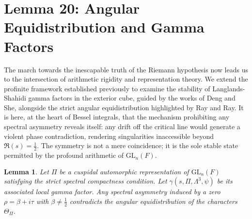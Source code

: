 \documentclass[
]{article}
\newtheorem{lemma}{Lemma}
\begin{document}
\section{Lemma 20: Angular Equidistribution and Gamma Factors}

The march towards the inescapable truth of the Riemann hypothesis now leads us to the intersection of arithmetic rigidity and representation theory. We extend the profinite framework established previously to examine the stability of Langlands-Shahidi gamma factors in the exterior cube, guided by the works of Deng and She, alongside the strict angular equidistribution highlighted by Ray and Ray. It is here, at the heart of Bessel integrals, that the mechanism prohibiting any spectral asymmetry reveals itself: any drift off the critical line would generate a violent phase contradiction, rendering singularities inaccessible beyond $\Re(s) = \frac{1}{2}$. The symmetry is not a mere coincidence; it is the sole stable state permitted by the profound arithmetic of $\mathrm{GL}_n(F)$.

\begin{lemma}
Let $\Pi$ be a cuspidal automorphic representation of $\mathrm{GL}_n(F)$ satisfying the strict spectral compactness condition. Let $\gamma(s, \Pi, \Lambda^3, \psi)$ be its associated local gamma factor. Any spectral asymmetry induced by a zero $\rho = \beta + i\tau$ with $\beta \neq \frac{1}{2}$ contradicts the angular equidistribution of the characters $\Theta_{\Pi}$.
\end{lemma}
\end{document}

